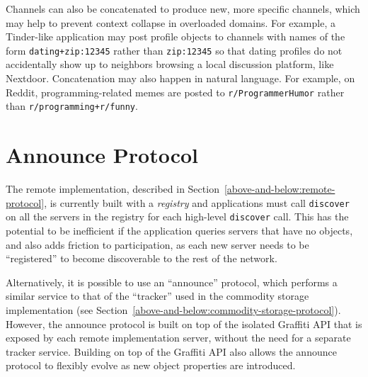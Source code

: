Channels can also be concatenated to produce new, more specific channels,
which may help to prevent context collapse in overloaded domains.
For example, a Tinder-like application may post profile objects
to channels with names of the form
\texttt{dating+\allowbreak{}zip:\allowbreak{}12345} rather than
\texttt{zip:\allowbreak{}12345} so that dating profiles
do not accidentally show up to neighbors browsing a local
discussion platform, like Nextdoor.
Concatenation may also happen in natural language.
For example, on Reddit,
programming-related memes are posted to \texttt{r/\allowbreak{}Programmer\allowbreak{}Humor}
rather than \texttt{r/\allowbreak{}programming+\allowbreak{}r/funny}.



\section{Announce Protocol}
\label{appendix:announce}

The remote implementation, described in Section~\ref{above-and-below:remote-protocol},
is currently built with a \emph{registry} and applications must
call \texttt{discover} on all the servers in the registry for
each high-level \texttt{discover} call.
This has the potential to be inefficient if the application queries
servers that have no objects, and also adds friction to participation,
as each new server needs to be ``registered'' to become discoverable
to the rest of the network.

Alternatively, it is possible to use an ``announce'' protocol,
which performs a similar service to that of the ``tracker'' used in
the commodity storage implementation (see Section~\ref{above-and-below:commodity-storage-protocol}). However, the announce protocol is built on top of the isolated Graffiti
API that is exposed by each remote implementation server, without the need for a separate
tracker service. Building on top of the Graffiti API also
allows the announce protocol to flexibly evolve as
new object properties are introduced.

